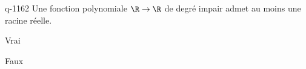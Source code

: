 \begin{truefalse}{q-1162}
Une fonction polynomiale $\R \to \R$ de degré impair admet au moins une racine réelle.
\item* Vrai
\item Faux
\end{truefalse}

